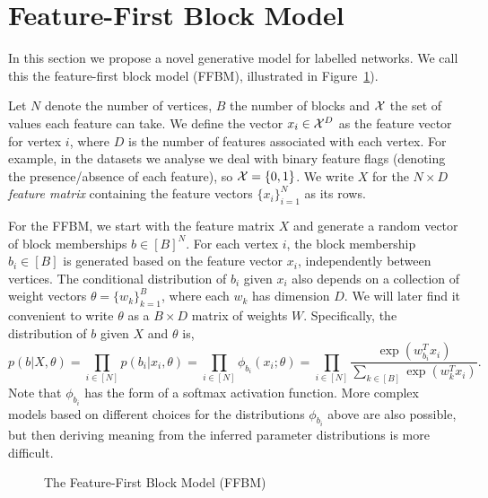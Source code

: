 \section{Feature-First Block Model}

In this section we propose a novel generative model for labelled networks. We call this the feature-first block model (FFBM),
illustrated in Figure~\ref{fig:ffbm}).

Let $N$ denote the number of vertices, $B$ the number of blocks
and ${\cal X}$ the set of values each feature can take.
We define the vector $x_i \in \mathcal{X}^D$ as the feature vector for vertex $i$, 
where $D$ is the number of features associated with each vertex.
For example, in the datasets we analyse we deal with binary feature flags
(denoting the presence/absence of each feature),
so $\mathcal{X} = \{0, 1\}$. We write $X$ for the $N\times D$ {\em feature matrix} containing
the feature vectors $\{x_i\}_{i=1}^{N}$ 
as its rows.

For the FFBM, we start with the feature matrix $X$ and generate a random
vector of block memberships $b \in [B]^N$. For each vertex $i$, the
block membership $b_i\in[B]$ is generated based on the feature
vector $x_i$, independently between vertices. The conditional
distribution of $b_i$ given $x_i$ also depends on a collection
of weight vectors $\theta=\{w_k\}_{k=1}^B$, where each
$w_k$ has dimension $D$. We will later find it convenient
to write $\theta$ as a $B \times D$ matrix of weights $W$. Specifically, 
the distribution of $b$ given $X$ and $\theta$ is,
%
\begin{equation}
	p(b| X, \theta) = \prod_{i \in [N]} p(b_i | x_i, \theta) = \prod_{i \in [N]} \phi_{b_i} (x_i; \theta)
	= \prod_{i \in [N]} \frac{\exp\left(w_{b_i}^T x_i\right)}{\sum_{k \in [B]} \exp \left( w_k^T x_i\right)}.
\end{equation}
%
Note that $\phi_{b_i}$ has the form of a softmax activation function.
More complex models based on different choices for the distributions
$\phi_{b_i}$ above are also possible, but then deriving meaning from 
the inferred parameter distributions is more difficult. 
%
\begin{figure}[!ht]
	\centering
	\caption{The Feature-First Block Model (FFBM)}
	\label{fig:ffbm}
\end{figure}

